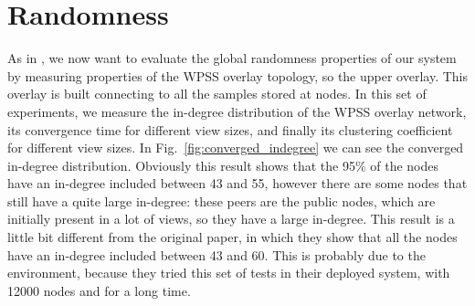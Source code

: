 \section{Randomness}
\label{sec:eval_randomness}
As in \cite{wormhole}, we now want to evaluate the global randomness properties of our system by measuring properties of the WPSS overlay topology, so the upper overlay. This overlay is built connecting to all the samples stored at nodes. In this set of experiments, we measure the in-degree distribution of the WPSS overlay network, its convergence time for different view sizes, and finally its clustering coefficient for different view sizes. In Fig.~\ref{fig:converged_indegree} we can see the converged in-degree distribution. Obviously this result shows that the 95\% of the nodes have an in-degree included between 43 and 55, however there are some nodes that still have a quite large in-degree: these peers are the public nodes, which are initially present in a lot of views, so they have a large in-degree. This result is a little bit different from the original paper, in which they show that all the nodes have an in-degree included between 43 and 60. This is probably due to the environment, because they tried this set of tests in their deployed system, with 12000 nodes and for a long time. 

